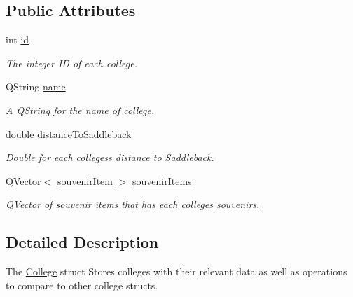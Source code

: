 \subsection*{Public Attributes}
\begin{DoxyCompactItemize}
\item 
\mbox{\label{struct_college_ac843c7eba029693454852fddeaeeb9b4}} 
int \mbox{\hyperlink{struct_college_ac843c7eba029693454852fddeaeeb9b4}{id}}
\begin{DoxyCompactList}\small\item\em The integer ID of each college. \end{DoxyCompactList}\item 
\mbox{\label{struct_college_ae8b235251d87f2e0709e90a697b0d06b}} 
Q\+String \mbox{\hyperlink{struct_college_ae8b235251d87f2e0709e90a697b0d06b}{name}}
\begin{DoxyCompactList}\small\item\em A Q\+String for the name of college. \end{DoxyCompactList}\item 
\mbox{\label{struct_college_a173efd43af4e173b2a77ba1054d91374}} 
double \mbox{\hyperlink{struct_college_a173efd43af4e173b2a77ba1054d91374}{distance\+To\+Saddleback}}
\begin{DoxyCompactList}\small\item\em Double for each colleges\textquotesingle{}s distance to Saddleback. \end{DoxyCompactList}\item 
\mbox{\label{struct_college_aa946205609ca2fd1e47641c1a0a9a09b}} 
Q\+Vector$<$ \mbox{\hyperlink{structsouvenir_item}{souvenir\+Item}} $>$ \mbox{\hyperlink{struct_college_aa946205609ca2fd1e47641c1a0a9a09b}{souvenir\+Items}}
\begin{DoxyCompactList}\small\item\em Q\+Vector of souvenir items that has each colleges\textquotesingle{} souvenirs. \end{DoxyCompactList}\end{DoxyCompactItemize}


\subsection{Detailed Description}
The \mbox{\hyperlink{struct_college}{College}} struct Stores colleges with their relevant data as well as operations to compare to other college structs. 

